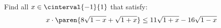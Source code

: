 Find all $x \in \cinterval{-1}{1}$ that satisfy:
\begin{equation*}
  x \cdot \paren{8 \sqrt{1 - x} + \sqrt{1 + x}}
  \leq
  11 \sqrt{1 + x} - 16 \sqrt{1 - x}
\end{equation*}
